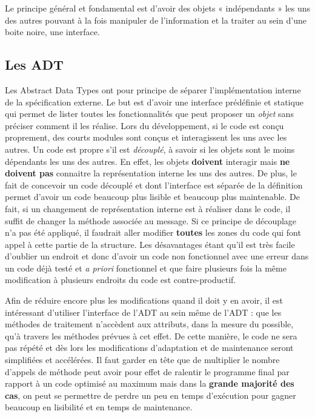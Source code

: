 \documentclass{article}
\begin{document}
	Le principe général et fondamental est d'avoir des objets « indépendants » les uns des autres pouvant à la fois manipuler de l'information et la traiter au sein d'une boite
	noire, une interface.

	\subsection{Les ADT}
		Les Abstract Data Types ont pour principe de séparer l'implémentation interne de la spécification externe. Le but est d'avoir une interface prédéfinie et statique qui permet
		de lister toutes les fonctionnalités que peut proposer un \textit{objet} sans préciser comment il les réalise. Lors du développement, si le code est conçu proprement, des
		courts modules sont conçus et interagissent les uns avec les autres. Un code est propre s'il est \textit{découplé}, à savoir si les objets sont le moins dépendants les
		uns des autres. En effet, les objets \textbf{doivent} interagir mais \textbf{ne doivent pas} connaitre la représentation interne les uns des autres. De plus, le fait de
		concevoir un code découplé et dont l'interface est séparée de la définition permet d'avoir un code beaucoup plus lisible et beaucoup plus maintenable. De fait, si un changement
		de représentation interne est à réaliser dans le code, il suffit de changer la méthode associée au message. Si ce principe de découplage n'a pas été appliqué, il faudrait
		aller modifier \textbf{toutes} les zones du code qui font appel à cette partie de la structure. Les désavantages étant qu'il est très facile d'oublier un endroit et donc d'avoir
		un code non fonctionnel avec une erreur dans un code déjà testé et \textit{a priori} fonctionnel et que faire plusieurs fois la même modification à plusieurs endroits du code est
		contre-productif.

		Afin de réduire encore plus les modifications quand il doit y en avoir, il est intéressant d'utiliser l'interface de l'ADT au sein même de l'ADT : que les méthodes de traitement
		n'accèdent aux attributs, dans la mesure du possible, qu'à travers les méthodes prévues à cet effet. De cette manière, le code ne sera pas répété et dès lors les modifications
		d'adaptation et de maintenance seront simplifiées et accélérées. Il faut garder en tête que de multiplier le nombre d'appels de méthode peut avoir pour effet de ralentir
		le programme final par rapport à un code optimisé au maximum mais dans la \textbf{grande majorité des cas}, on peut se permettre de perdre un peu en temps d'exécution pour gagner
		beaucoup en lisibilité et en temps de maintenance.
	
\end{document}
